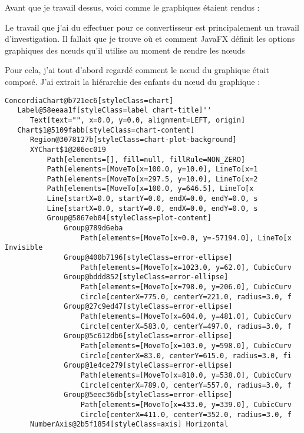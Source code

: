 Avant que je travail dessus, voici comme le graphiques étaient rendus :

Le travail que j'ai du effectuer pour ce convertisseur est principalement un travail d'investigation. Il fallait que je trouve où et comment JavaFX définit les options graphiques des nœuds qu'il utilise au moment de rendre les nœuds 

Pour cela, j'ai tout d'abord regardé comment le nœud du graphique était composé. J'ai extrait la hiérarchie des enfants du nœud du graphique :

\begin{verbatim}
ConcordiaChart@b721ec6[styleClass=chart]
   Label@58eeaa1f[styleClass=label chart-title]''
      Text[text="", x=0.0, y=0.0, alignment=LEFT, origin]
   Chart$1@5109fabb[styleClass=chart-content]
      Region@3078127b[styleClass=chart-plot-background]
      XYChart$1@206ec019
          Path[elements=[], fill=null, fillRule=NON_ZERO]
          Path[elements=[MoveTo[x=100.0, y=10.0], LineTo[x=1 
          Path[elements=[MoveTo[x=297.5, y=10.0], LineTo[x=2
          Path[elements=[MoveTo[x=100.0, y=646.5], LineTo[x 
          Line[startX=0.0, startY=0.0, endX=0.0, endY=0.0, s 
          Line[startX=0.0, startY=0.0, endX=0.0, endY=0.0, s
          Group@5867eb04[styleClass=plot-content]
              Group@789d6eba
                  Path[elements=[MoveTo[x=0.0, y=-57194.0], LineTo[x Invisible
              Group@400b7196[styleClass=error-ellipse]
                  Path[elements=[MoveTo[x=1023.0, y=62.0], CubicCurv
              Group@bddd852[styleClass=error-ellipse]
                  Path[elements=[MoveTo[x=798.0, y=206.0], CubicCurv
                  Circle[centerX=775.0, centerY=221.0, radius=3.0, f
              Group@27c9ed47[styleClass=error-ellipse]
                  Path[elements=[MoveTo[x=604.0, y=481.0], CubicCurv
                  Circle[centerX=583.0, centerY=497.0, radius=3.0, f
              Group@5c612db6[styleClass=error-ellipse]
                  Path[elements=[MoveTo[x=103.0, y=598.0], CubicCurv
                  Circle[centerX=83.0, centerY=615.0, radius=3.0, fi
              Group@1e4ce279[styleClass=error-ellipse]
                  Path[elements=[MoveTo[x=810.0, y=538.0], CubicCurv
                  Circle[centerX=789.0, centerY=557.0, radius=3.0, f
              Group@5eec36db[styleClass=error-ellipse]
                  Path[elements=[MoveTo[x=433.0, y=339.0], CubicCurv
                  Circle[centerX=411.0, centerY=352.0, radius=3.0, f
      NumberAxis@2b5f1854[styleClass=axis] Horizontal 

\end{verbatim}
